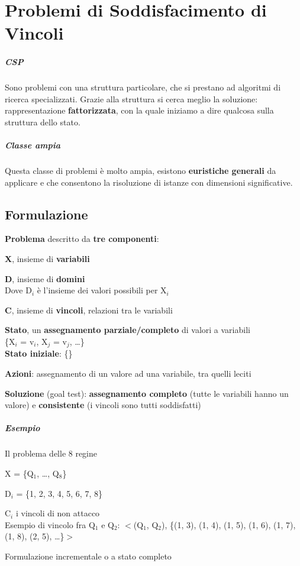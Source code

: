 \documentclass[10pt]{book}
\begin{document}
\chapter{Problemi di Soddisfacimento di Vincoli}
\paragraph{CSP} Sono problemi con una struttura particolare, che si prestano ad algoritmi di ricerca specializzati. Grazie alla struttura si cerca meglio la soluzione: rappresentazione \textbf{fattorizzata}, con la quale iniziamo a dire qualcosa sulla struttura dello stato.
\paragraph{Classe ampia} Questa classe di problemi è molto ampia, esistono \textbf{euristiche generali} da applicare e che consentono la risoluzione di istanze con dimensioni significative.
\section{Formulazione} 
\begin{list}{}{}
	\item\textbf{Problema} descritto da \textbf{tre componenti}:
		\begin{list}{}{}
			\item \textbf{X}, insieme di \textbf{variabili}
			\item \textbf{D}, insieme di \textbf{domini}\\
			Dove D$_i$ è l'insieme dei valori possibili per X$_i$
			\item \textbf{C}, insieme di \textbf{vincoli}, relazioni tra le variabili
		\end{list}
	\item\textbf{Stato}, un \textbf{assegnamento parziale/completo} di valori a variabili\\
	\{X$_i$ = v$_i$, X$_j$ = v$_j$, \ldots\}\\
	\textbf{Stato iniziale}: \{\}
	\item \textbf{Azioni}: assegnamento di un valore ad una variabile, tra quelli leciti
	\item \textbf{Soluzione} (goal test): \textbf{assegnamento completo} (tutte le variabili hanno un valore) e \textbf{consistente} (i vincoli sono tutti soddisfatti)
\end{list}
\paragraph{Esempio} Il problema delle 8 regine
\begin{list}{}{}
	\item X = \{Q$_1$, \ldots, Q$_8$\}
	\item D$_i$ = \{1, 2, 3, 4, 5, 6, 7, 8\}
	\item C$_i$ i vincoli di non attacco\\
	Esempio di vincolo fra Q$_1$ e Q$_2$: $<$(Q$_1$, Q$_2$), \{(1, 3), (1, 4), (1, 5), (1, 6), (1, 7), (1, 8), (2, 5), \ldots\}$>$
	\item Formulazione incrementale o a stato completo
\end{list}
\end{document}
